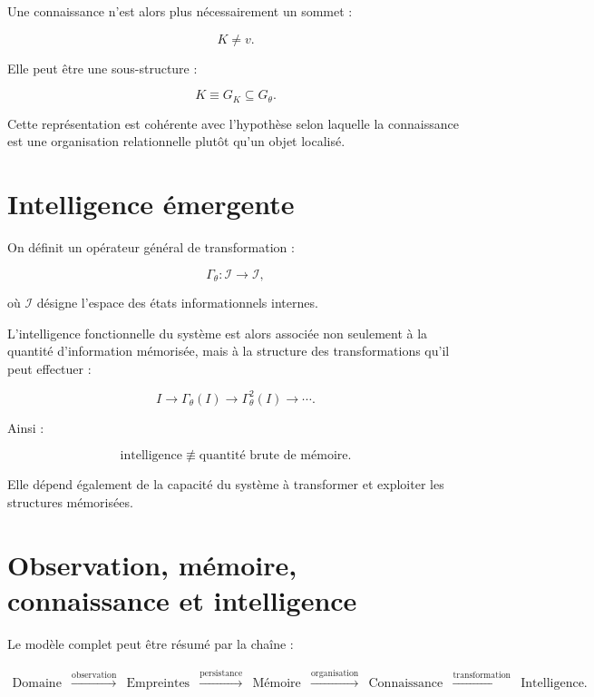 \documentclass[11pt,a4paper]{article}
\begin{document}
Une connaissance n'est alors plus nécessairement un sommet :

\[
K\neq v.
\]

Elle peut être une sous-structure :

\[
K\equiv G_K\subseteq G_\theta.
\]

Cette représentation est cohérente avec l'hypothèse selon laquelle la
connaissance est une organisation relationnelle plutôt qu'un objet localisé.

\section{Intelligence émergente}

On définit un opérateur général de transformation :

\[
\Gamma_\theta:
\mathcal I
\rightarrow
\mathcal I,
\]

où $\mathcal I$ désigne l'espace des états informationnels internes.

L'intelligence fonctionnelle du système est alors associée non seulement à
la quantité d'information mémorisée, mais à la structure des transformations
qu'il peut effectuer :

\[
I
\rightarrow
\Gamma_\theta(I)
\rightarrow
\Gamma_\theta^2(I)
\rightarrow
\cdots.
\]

Ainsi :

\[
\boxed{
\text{intelligence}
\not\equiv
\text{quantité brute de mémoire}.
}
\]

Elle dépend également de la capacité du système à transformer et exploiter
les structures mémorisées.

\section{Observation, mémoire, connaissance et intelligence}

Le modèle complet peut être résumé par la chaîne :

\[
\boxed{
\begin{array}{ccccccccc}
\text{Domaine}
&
\xrightarrow{\text{observation}}
&
\text{Empreintes}
&
\xrightarrow{\text{persistance}}
&
\text{Mémoire}
&
\xrightarrow{\text{organisation}}
&
\text{Connaissance}
&
\xrightarrow{\text{transformation}}
&
\text{Intelligence}.
\end{array}
}
\]
\end{document}
